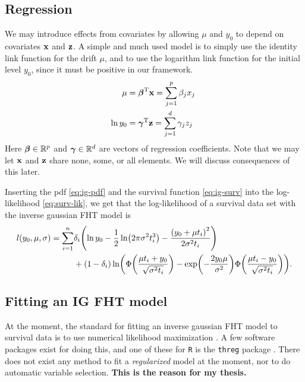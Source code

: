 \subsection{Regression}
We may introduce effects from covariates by allowing $\mu$ and $y_0$ to depend on covariates $\mathbf{x}$ and $\mathbf{z}$. A simple and much used model is to simply use the identity link function for the drift $\mu$, and to use the logarithm link function for the initial level $y_0$, since it must be positive in our framework.
\begin{align}\label{eq:coeffs}
\begin{split}
    \mu&=\bbeta^\T\x=\sum_{j=1}^p \beta_jx_j \\
    \ln y_0&=\bgamma^\T\z=\sum_{j=1}^d \gamma_jz_j
\end{split}
\end{align}
Here $\boldsymbol{\beta}\in\mathbb{R}^p$ and $\boldsymbol{\gamma}\in\mathbb{R}^d$ are vectors of regression coefficients. Note that we may let $\mathbf{x}$ and $\mathbf{z}$ share none, some, or all elements. We will discuss consequences of this later.

Inserting the pdf \eqref{eq:ig-pdf} and the survival function \eqref{eq:ig-surv} into the log-likelihood \eqref{eq:surv-lik}, we get that the log-likelihood of a survival data set with the inverse gaussian FHT model is
\begin{align}\label{eq:loglik}
\begin{split}
    l(y_0,\mu,\sigma)=\sum_{i=1}^n&\di\p*{\ln y_0-\frac{1}{2}\ln\p*{2\pi\sigma^2\ti^3}-\frac{\p*{y_0+\mu\ti}^2}{2\sigma^2\ti}} \\
    &+
    (1-\di)\ln\p*{\Phi\p*{\frac{\mu\ti+y_0}{\sqrt{\sigma^2\ti}}}-\exp\p*{-\frac{2y_0\mu}{\sigma^2}}\Phi\p*{\frac{\mu\ti-y_0}{\sqrt{\sigma^2\ti}}}}.
\end{split}
\end{align}

\subsection{Fitting an IG FHT model}
At the moment, the standard for fitting an inverse gaussian FHT model to survival data is to use numerical likelihood maximization \cite{caroni2017}. A few software packages exist for doing this, and one of these for \verb|R| \cite{Rlang} is the \verb|threg| package \cite{threg}. There does not exist any method to fit a \textit{regularized} model at the moment, nor to do automatic variable selection. \textbf{This is the reason for my thesis.}



